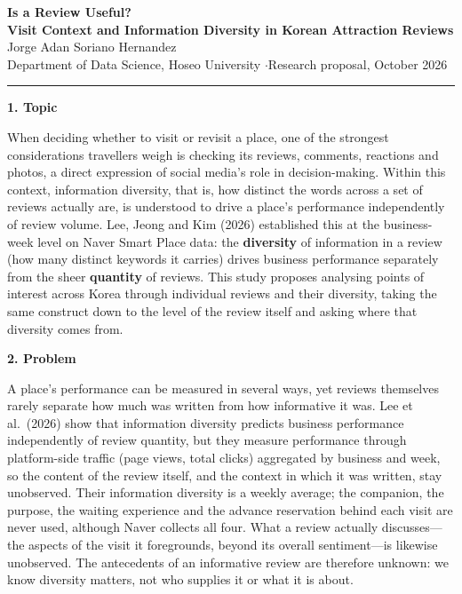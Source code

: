 \documentclass[10pt,a4paper]{article}
\newcommand{\headrule}{\vspace{1pt}\noindent\rule{\linewidth}{0.4pt}\vspace{1pt}}
\newcommand{\sect}[1]{\vspace{3pt}\noindent\textbf{#1}\par\vspace{1pt}}
\begin{document}
\footnotesize

\begin{center}
{\large\textbf{Is a Review Useful?}}\\[2pt]
{\large\textbf{Visit Context and Information Diversity in Korean Attraction Reviews}}\\[5pt]
{\normalsize Jorge Adan Soriano Hernandez}\\
{\small Department of Data Science, Hoseo University \quad$\cdot$\quad Research proposal, October 2026}
\end{center}

\headrule

\sect{1. Topic}
When deciding whether to visit or revisit a place, one of the strongest considerations travellers
weigh is checking its reviews, comments, reactions and photos, a direct expression of social media's
role in decision-making. Within this context, information diversity, that is, how distinct the words
across a set of reviews actually are, is understood to drive a place's performance independently of
review volume. Lee, Jeong and Kim (2026) established this at the business-week level on Naver Smart
Place data: the \textbf{diversity} of information in a review (how many distinct keywords it carries)
drives business performance separately from the sheer \textbf{quantity} of reviews. This study proposes
analysing points of interest across Korea through individual reviews and their diversity, taking the
same construct down to the level of the review itself and asking where that diversity comes from.

\sect{2. Problem}
A place's performance can be measured in several ways, yet reviews themselves rarely separate how
much was written from how informative it was. Lee et al.\ (2026) show that information diversity
predicts business performance independently of review quantity, but they measure performance through
platform-side traffic (page views, total clicks) aggregated by business and week, so the content of
the review itself, and the context in which it was written, stay unobserved. Their information
diversity is a weekly average; the companion, the purpose, the waiting experience and the advance
reservation behind each visit are never used, although Naver collects all four. What a review
actually discusses---the aspects of the visit it foregrounds, beyond its overall sentiment---is
likewise unobserved. The antecedents of an informative review are therefore unknown: we know
diversity matters, not who supplies it or what it is about.
\end{document}
